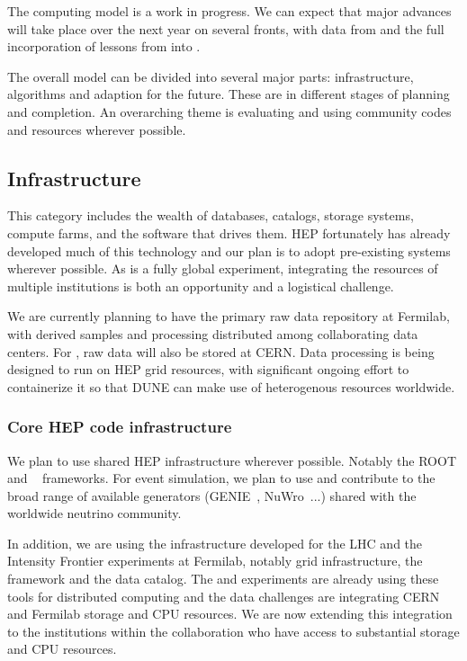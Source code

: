 The   computing model is a work in progress.  We can expect that major advances will take place over the next year on several fronts, with data from  and the full incorporation of lessons from   into  . 


The overall model can be divided into several major parts:  infrastructure, algorithms and adaption for the future.  These are in different stages of planning and completion.  An overarching theme is evaluating and using community codes and resources wherever possible. 



\subsection{Infrastructure}
This category includes the wealth of databases, catalogs, storage systems, compute farms, and the software that drives them.  HEP fortunately has already developed much of this technology and our plan is to adopt pre-existing systems wherever possible.  As   is a fully global experiment, integrating the resources of multiple institutions is both an opportunity and a logistical challenge.

We are currently planning to have the primary raw data repository at Fermilab, with derived samples and processing distributed among collaborating data centers.  For , raw data will also be stored at CERN.  Data processing is being designed to run on HEP grid resources, with significant ongoing effort to containerize it so that DUNE can make use of heterogenous resources worldwide. 


\subsubsection{Core HEP code infrastructure}
We plan to use shared HEP infrastructure wherever possible.  Notably the ROOT\cite{root} and ~\cite{geant4,Allison:2006ve} frameworks.   For event simulation, we plan to use and contribute to  the broad range of available generators (GENIE~\cite{Andreopoulos:2009rq}, NuWro~\cite{NuWro2012}...) shared with the worldwide neutrino community.

In addition, we are using the infrastructure developed for the LHC and the Intensity Frontier experiments at Fermilab, notably grid infrastructure,  the  framework and the  data catalog.  The  and  experiments are already using these tools for distributed computing and the  data challenges are integrating CERN and Fermilab storage and CPU resources.  We are now extending this integration to the  institutions within the collaboration who have access to substantial storage and CPU resources. 



